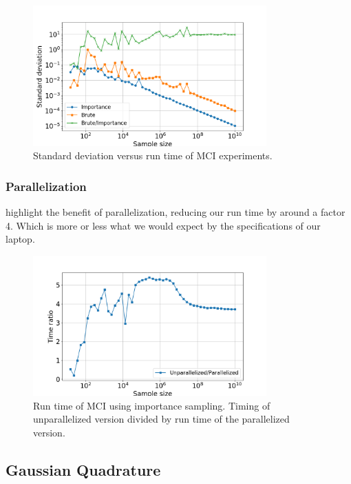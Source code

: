 \begin{figure}[H]
  \centering
  \includegraphics[width=0.8\textwidth]{../figures/mc_std_time.png}
  \caption{Standard deviation versus run time of MCI experiments.}

  \label{fig:mc_std_time}
\end{figure}

\subsubsection{Parallelization}

 highlight the benefit of parallelization, reducing our
run time by around a factor 4. Which is more or less what we would expect
by the specifications of our laptop.     

\begin{figure}[H]
  \centering
  \includegraphics[width=0.8\textwidth]{../figures/mc_time_ratio.png}
  \caption{Run time of MCI using importance sampling. Timing of unparallelized
  version divided by run time of the parallelized version.}

  \label{fig:mc_time_ratio}
\end{figure}


\subsection{Gaussian Quadrature}

